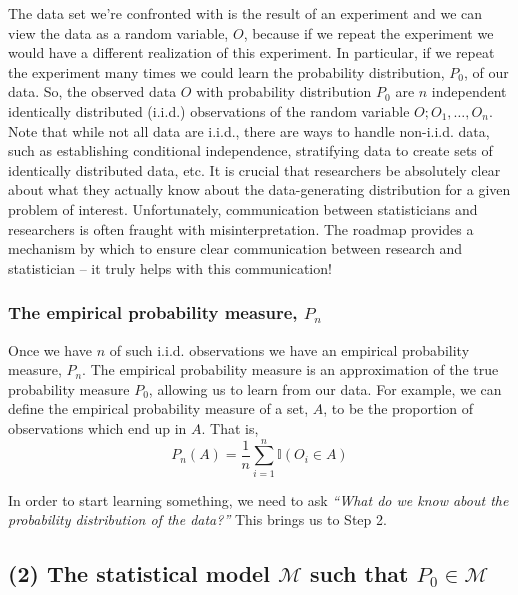 \documentclass[12pt, krantz2,]{book}
\theoremstyle{definition}
\theoremstyle{definition}
\theoremstyle{definition}
\newcommand{\1}{\mathbbm{1}}
\begin{document}
The data set we're confronted with is the result of an experiment and we can
view the data as a random variable, \(O\), because if we repeat the experiment
we would have a different realization of this experiment. In particular, if we
repeat the experiment many times we could learn the probability distribution,
\(P_0\), of our data. So, the observed data \(O\) with probability distribution
\(P_0\) are \(n\) independent identically distributed (i.i.d.) observations of the
random variable \(O; O_1, \ldots, O_n\). Note that while not all data are i.i.d.,
there are ways to handle non-i.i.d. data, such as establishing conditional
independence, stratifying data to create sets of identically distributed data,
etc. It is crucial that researchers be absolutely clear about what they actually
know about the data-generating distribution for a given problem of interest.
Unfortunately, communication between statisticians and researchers is often
fraught with misinterpretation. The roadmap provides a mechanism by which to
ensure clear communication between research and statistician -- it truly helps
with this communication!

\hypertarget{the-empirical-probability-measure-p_n}{%
\subsubsection*{\texorpdfstring{The empirical probability measure, \(P_n\)}{The empirical probability measure, P\_n}}\label{the-empirical-probability-measure-p_n}}


Once we have \(n\) of such i.i.d. observations we have an empirical probability
measure, \(P_n\). The empirical probability measure is an approximation of the
true probability measure \(P_0\), allowing us to learn from our data. For
example, we can define the empirical probability measure of a set, \(A\), to be
the proportion of observations which end up in \(A\). That is,
\begin{equation*}
  P_n(A) = \frac{1}{n}\sum_{i=1}^{n} \mathbb{I}(O_i \in A)
\end{equation*}

In order to start learning something, we need to ask \emph{``What do we know about the
probability distribution of the data?''} This brings us to Step 2.

\hypertarget{the-statistical-model-mathcalm-such-that-p_0-in-mathcalm}{%
\subsection*{\texorpdfstring{(2) The statistical model \(\mathcal{M}\) such that \(P_0 \in \mathcal{M}\)}{(2) The statistical model \textbackslash{}mathcal\{M\} such that P\_0 \textbackslash{}in \textbackslash{}mathcal\{M\}}}\label{the-statistical-model-mathcalm-such-that-p_0-in-mathcalm}}
\end{document}
